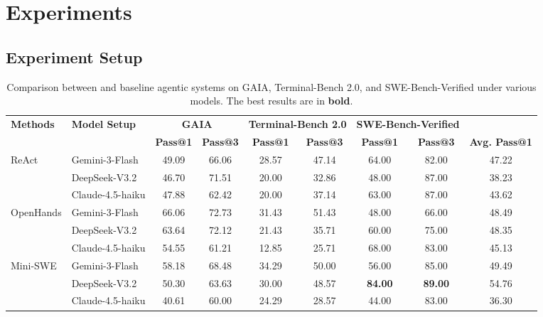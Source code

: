 
\section{Experiments}

\subsection{Experiment Setup}

\begin{table}[!t]
\centering
\small
\setlength{\tabcolsep}{5pt}
\renewcommand{\arraystretch}{1.1}
\begin{threeparttable}
\caption{Comparison between \our and baseline agentic systems on GAIA, Terminal-Bench 2.0, and SWE-Bench-Verified under various models. The best results are in \textbf{bold}.}
\label{tab:main_results}
\begin{tabular}{l l cc cc cc c}
\toprule
\textbf{Methods} & \textbf{Model Setup} 
& \multicolumn{2}{c}{\textbf{GAIA}} 
& \multicolumn{2}{c}{\textbf{Terminal-Bench 2.0}} 
& \multicolumn{2}{c}{\textbf{SWE-Bench-Verified}}
\\
\cmidrule(lr){3-4}\cmidrule(lr){5-6}\cmidrule(lr){7-8}
& 
& \textbf{Pass@1} & \textbf{Pass@3}
& \textbf{Pass@1} & \textbf{Pass@3}
& \textbf{Pass@1} & \textbf{Pass@3}
& \textbf{Avg. Pass@1}\\
\midrule

\multirow[c]{3}{*}{ReAct}
& Gemini-3-Flash     & 49.09 & 66.06 & 28.57 & 47.14 & 64.00 & 82.00 & 47.22 \\
& DeepSeek-V3.2      & 46.70 & 71.51 & 20.00 & 32.86 & 48.00 & 87.00 & 38.23 \\
& Claude-4.5-haiku   & 47.88 & 62.42 & 20.00 & 37.14 & 63.00 & 87.00 & 43.62 \\
\cmidrule(lr){1-9}

\multirow[c]{3}{*}{OpenHands}
& Gemini-3-Flash     & 66.06 & 72.73 & 31.43 & 51.43 & 48.00 & 66.00 & 48.49 \\
& DeepSeek-V3.2      & 63.64 & 72.12 & 21.43 & 35.71 & 60.00 & 75.00 & 48.35 \\
& Claude-4.5-haiku   & 54.55 & 61.21 & 12.85 & 25.71 & 68.00 & 83.00 & 45.13 \\
\cmidrule(lr){1-9}

\multirow[c]{3}{*}{Mini-SWE}
& Gemini-3-Flash     & 58.18 & 68.48 & 34.29 & 50.00 & 56.00 & 85.00 & 49.49 \\
& DeepSeek-V3.2      & 50.30 & 63.63 & 30.00 & 48.57 & \textbf{84.00} & \textbf{89.00} & 54.76 \\
& Claude-4.5-haiku   & 40.61 & 60.00 & 24.29 & 28.57 & 44.00 & 83.00 & 36.30 \\
\cmidrule(lr){1-9}


\end{tabular}
\end{threeparttable}
\end{table}
